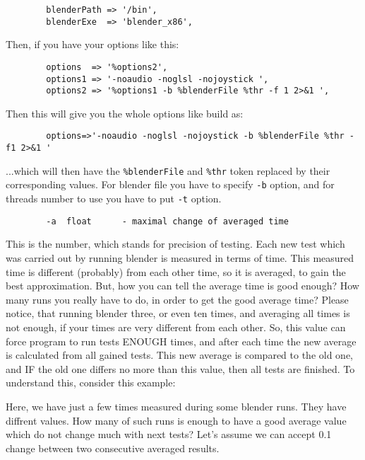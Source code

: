 \documentclass{article}
\begin{document}
\begin{verbatim}
        blenderPath => '/bin',
        blenderExe  => 'blender_x86',
\end{verbatim}


Then, if you have your options like this:

\begin{verbatim}
        options  => '%options2',
        options1 => '-noaudio -noglsl -nojoystick ',
        options2 => '%options1 -b %blenderFile %thr -f 1 2>&1 ',
\end{verbatim}


Then this will give you the whole options like build as:

\begin{verbatim}
        options=>'-noaudio -noglsl -nojoystick -b %blenderFile %thr -f1 2>&1 '
\end{verbatim}


...which will then have the \texttt{\%blenderFile} and \texttt{\%thr} token replaced by their
corresponding values. For blender file you have to specify \texttt{-b} option,
and for threads number to use you have to put \texttt{-t} option.

\begin{verbatim}
        -a  float      - maximal change of averaged time
\end{verbatim}


This is the number, which stands for precision of testing. Each new test which
was carried out by running blender is measured in terms of time. This measured
time is different (probably) from each other time, so it is averaged, to gain
the best approximation.  But, how you can tell the average time is good enough?
How many runs you really have to do, in order to get the good average time?
Please notice, that running blender three, or even ten times, and averaging all
times is not enough, if your times are very different from each other. So, this
value can force program to run tests ENOUGH times, and after each time the new
average is calculated from all gained tests. This new average is compared to
the old one, and IF the old one differs no more than this value, then all tests
are finished. To understand this, consider this example:



Here, we have just a few times measured during some blender runs. They have
diffrent values. How many of such runs is enough to have a good average value
which do not change much with next tests? Let's assume we can accept 0.1
change between two consecutive averaged results.
\end{document}
